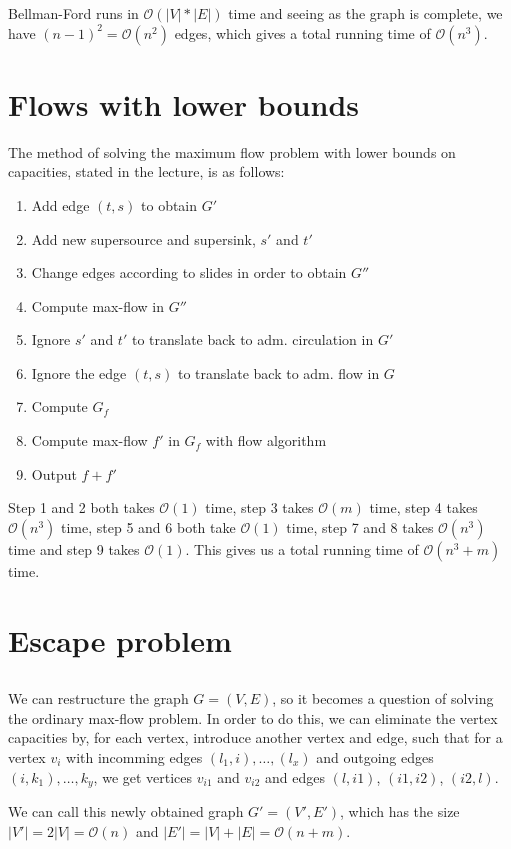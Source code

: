 \documentclass[a4paper]{article}
\begin{document}
Bellman-Ford runs in $\mathcal{O}(|V|*|E|)$ time and seeing as the graph is complete, we have $(n-1)^2=\mathcal{O}(n^2)$ edges, which gives a total running time of $\mathcal{O}(n^3)$.
\section{Flows with lower bounds}
The method of solving the maximum flow problem with lower bounds on capacities, stated in the lecture, is as follows:
\begin{enumerate}
    \item Add edge $(t,s)$ to obtain $G'$
    \item Add new supersource and supersink, $s'$ and $t'$
    \item Change edges according to slides in order to obtain $G''$
    \item Compute max-flow in $G''$
    \item Ignore $s'$ and $t'$ to translate back to adm. circulation in $G'$
    \item Ignore the edge $(t,s)$ to translate back to adm. flow in $G$
    \item Compute $G_f$
    \item Compute max-flow $f'$ in $G_f$ with flow algorithm
    \item Output $f+f'$
\end{enumerate}
Step 1 and 2 both takes $\mathcal{O}(1)$ time, step 3 takes $\mathcal{O}(m)$ time, step 4 takes $\mathcal{O}(n^3)$ time, step 5 and 6 both take $\mathcal{O}(1)$ time, step 7 and 8 takes $\mathcal{O}(n^3)$ time and step 9 takes $\mathcal{O}(1)$. This gives us a total running time of $\mathcal{O}(n^3+m)$ time.
\section{Escape problem}
\subsection{}
We can restructure the graph $G=(V,E)$, so it becomes a question of solving the ordinary max-flow problem. In order to do this, we can eliminate the vertex capacities by, for each vertex, introduce another vertex and edge, such that for a vertex $v_i$ with incomming edges $(l_1,i), \ldots, (l_x)$  and outgoing edges $(i,k_1),\ldots, k_y$, we get vertices $v_{i1}$ and $v_{i2}$ and edges $(l,i1)$, $(i1,i2)$, $(i2,l)$.

We can call this newly obtained graph $G'=(V', E')$, which has the size $|V'|=2|V|= \mathcal{O}(n)$ and $|E'|=|V|+|E|=\mathcal{O}(n+m)$.
\end{document}

